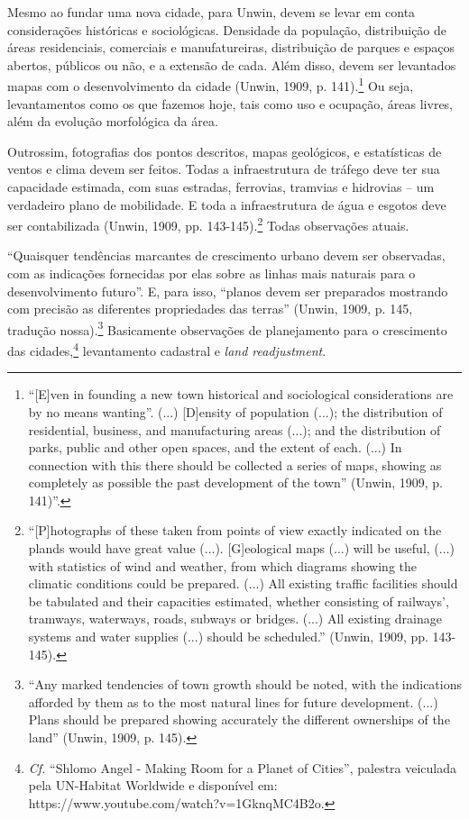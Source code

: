 \documentclass[12pt, a4paper]{book} %
\begin{document}
        Mesmo ao fundar uma nova cidade, para Unwin, devem se levar em conta considerações históricas e sociológicas. Densidade da população, distribuição de áreas residenciais, comerciais e manufatureiras, distribuição de parques e espaços abertos, públicos ou não, e a extensão de cada. Além disso, devem ser levantados mapas com o desenvolvimento da cidade (Unwin, 1909, p. 141).\footnote[20]{``[E]ven in founding a new town historical and sociological considerations are by no means wanting''. (...) [D]ensity of population (...); the distribution of residential, business, and manufacturing areas (...); and the distribution of parks, public and other open spaces, and the extent of each. (...) In connection with this there should be collected a series of maps, showing as completely as possible the past development of the town'' (Unwin, 1909, p. 141)''.} Ou seja, levantamentos como os que fazemos hoje, tais como uso e ocupação, áreas livres, além da evolução morfológica da área.

        Outrossim, fotografias dos pontos descritos, mapas geológicos, e estatísticas de ventos e clima devem ser feitos. Todas a infraestrutura de tráfego deve ter sua capacidade estimada, com suas estradas, ferrovias, tramvias e hidrovias – um verdadeiro plano de mobilidade. E toda a infraestrutura de água e esgotos deve ser contabilizada (Unwin, 1909, pp. 143-145).\footnote[21]{``[P]hotographs of these taken from points of view exactly indicated on the plands would have great value (...). [G]eological maps (...) will be useful, (...) with statistics of wind and weather, from which diagrams showing the climatic conditions could be prepared. (...) All existing traffic facilities should be tabulated and their capacities estimated, whether consisting of railways', tramways, waterways, roads, subways or bridges. (...) All existing drainage systems and water supplies (...) should be scheduled.'' (Unwin, 1909, pp. 143-145).} Todas observações atuais.

        ``Quaisquer tendências marcantes de crescimento urbano devem ser observadas, com as indicações fornecidas por elas sobre as linhas mais naturais para o desenvolvimento futuro''. E, para isso, ``planos devem ser preparados mostrando com precisão as diferentes propriedades das terras'' (Unwin, 1909, p. 145, tradução nossa).\footnote[22]{``Any marked tendencies of town growth should be noted, with the indications afforded by them as to the most natural lines for future development. (...) Plans should be prepared showing accurately the different ownerships of the land'' (Unwin, 1909, p. 145).} Basicamente observações de planejamento para o crescimento das cidades,\footnote[23]{\textit{Cf.} ``Shlomo Angel - Making Room for a Planet of Cities'', palestra veiculada pela UN-Habitat Worldwide e disponível em: https://www.youtube.com/watch?v=1GknqMC4B2o.} levantamento cadastral e \textit{land readjustment}.
\end{document}
